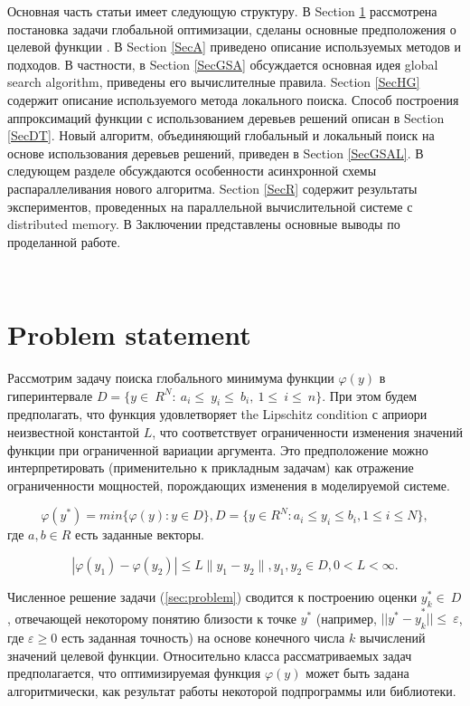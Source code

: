 \documentclass{svproc}
\begin{document}
Основная часть статьи имеет следующую структуру. 
В Section \ref{SecPS} рассмотрена постановка задачи глобальной оптимизации, сделаны основные предположения о целевой функции .
В Section \ref{SecA} приведено описание используемых методов и подходов.
В частности, в Section \ref{SecGSA} обсуждается основная идея global search algorithm, приведены его вычислителные правила.
Section \ref{SecHG} содержит описание используемого метода локального поиска.
Способ построения аппроксимаций функции с использованием деревьев решений описан в Section \ref{SecDT}.
Новый алгоритм, объединяющий глобальный и локальный поиск на основе использования деревьев решений, приведен в Section \ref{SecGSAL}.
В следующем разделе обсуждаются особенности асинхронной схемы распараллеливания нового алгоритма.
Section \ref{SecR} содержит результаты экспериментов, проведенных на параллельной вычислительной системе с distributed memory.
В Заключении представлены основные выводы по проделанной работе.

\
\section{Problem statement}\label{SecPS}

Рассмотрим задачу поиска глобального минимума функции $\varphi(y)$ в гиперинтервале $D=\{ y\in\ R^N:\ a_i\le\ y_i\le\ b_i,\ 1\le\ i\le\ n \}$. При этом будем предполагать, что функция удовлетворяет the Lipschitz condition с априори неизвестной константой $L$, что соответствует ограниченности изменения значений функции при ограниченной вариации аргумента. Это предположение можно интерпретировать (применительно к прикладным задачам) как отражение ограниченности мощностей, порождающих изменения в моделируемой системе. 




\begin{equation} \label{sec:problem}   
\varphi(y^*) = min\{\varphi(y):y\in D\}, D = \{y \in R^N : a_i \leq y_i \leq b_i, 1 \leq i \leq N \},
\end{equation}
где $a,b \in R$ есть заданные векторы.


\begin{displaymath}
|\varphi(y_1)-\varphi(y_2)|\leq L\parallel y_1-y_2 \parallel
,y_1,y_2 \in D, 0<L< \infty.
\end{displaymath}




Численное решение задачи (\ref{sec:problem})   сводится к построению оценки $ y_k^\ast\in\ D$ , отвечающей некоторому понятию близости к точке $y^\ast$ (например, ${||y^\ast-y}_k^\ast||\le\ \varepsilon$, где $\varepsilon\geq0$ есть заданная точность) на основе конечного числа $k$ вычислений значений целевой функции. Относительно класса рассматриваемых задач предполагается, что оптимизируемая функция $\varphi(y)$ может быть задана алгоритмически, как результат работы некоторой подпрограммы или библиотеки.
\end{document}
